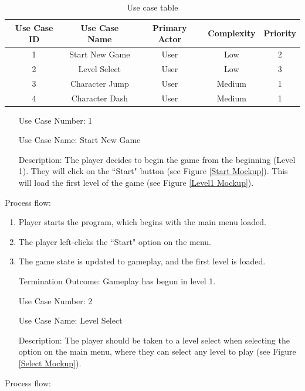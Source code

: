 \documentclass[10pt,conference,onecolumn,compsoc]{IEEEtran}
\begin{document}
\begin{table}
\centering
\begin{tabular}{|c|c|c|c|c|}
\hline
Use Case ID & Use Case Name & Primary Actor & Complexity & Priority \\
\hline \hline
1 & Start New Game & User & Low & 2\\
\hline
2 & Level Select & User & Low & 3\\
\hline
3 & Character Jump & User & Medium & 1\\
\hline
4 & Character Dash & User & Medium & 1\\
\hline

\end{tabular}
\caption{Use case table}
\label{tab:useCaseIndex}
\end{table}


\begin{itemize}
\item[Use Case Number:] 1
\item[Use Case Name:] Start New Game
\item[Description:] The player decides to begin the game from the beginning (Level 1). They will click on the ``Start" button (see Figure \ref{Start Mockup}). This will load the first level of the game (see Figure \ref{Level1 Mockup}).
\end{itemize}

Process flow:

\begin{enumerate}
\item Player starts the program, which begins with the main menu loaded.
\item The player left-clicks the ``Start" option on the menu.
\item The game state is updated to gameplay, and the first level is loaded.
\item[Termination Outcome:] Gameplay has begun in level 1.
\end{enumerate}

\begin{itemize}
\item[Use Case Number:] 2
\item[Use Case Name:] Level Select
\item[Description:] The player should be taken to a level select when selecting the option on the main menu, where they can select any level to play (see Figure \ref{Select Mockup}).
\end{itemize}

Process flow:
\end{document}

